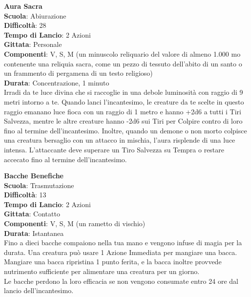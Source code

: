 \begin{multicols}{2}
\medskip\textbf{Aura Sacra}\\
\textbf{Scuola}: Abiurazione\\
\textbf{Difficoltà}:  28\\
\textbf{Tempo di Lancio}: 2 Azioni\\
\textbf{Gittata}: Personale\\
\textbf{Componenti}: V, S, M (un minuscolo reliquario del valore di almeno 1.000 mo contenente una reliquia sacra, come un pezzo di tessuto dell'abito di un santo o un frammento di pergamena di un testo religioso)\\
\textbf{Durata}: Concentrazione, 1 minuto\\
Irradi da te luce divina che si raccoglie in una debole luminosità con raggio di 9 metri intorno a te. Quando lanci l'incantesimo, le creature da te scelte in questo raggio emanano luce fioca con un raggio di 1 metro e hanno {+2d6} a tutti i Tiri Salvezza, mentre le altre creature hanno {-2d6} sui Tiri per Colpire contro di loro fino al termine dell'incantesimo. Inoltre, quando un demone o non morto colpisce una creatura bersaglio con un attacco in mischia, l’aura risplende di una luce intensa. L’attaccante deve superare un Tiro Salvezza su Tempra o restare accecato fino al termine dell'incantesimo.

\medskip\textbf{Bacche Benefiche}\\
\textbf{Scuola}: Trasmutazione\\
\textbf{Difficoltà}:  13\\
\textbf{Tempo di Lancio}: 2 Azioni\\
\textbf{Gittata}: Contatto\\
\textbf{Componenti}: V, S, M (un rametto di vischio)\\
\textbf{Durata}: Istantanea\\
Fino a dieci bacche compaiono nella tua mano e vengono infuse di magia per la durata. Una creatura può usare 1 Azione Immediata per mangiare una bacca. Mangiare una bacca ripristina 1 punto ferita, e la bacca inoltre provvede nutrimento sufficiente per alimentare una creatura per un giorno.\\
Le bacche perdono la loro efficacia se non vengono consumate entro 24 ore dal lancio dell'incantesimo. 


\end{multicols}
